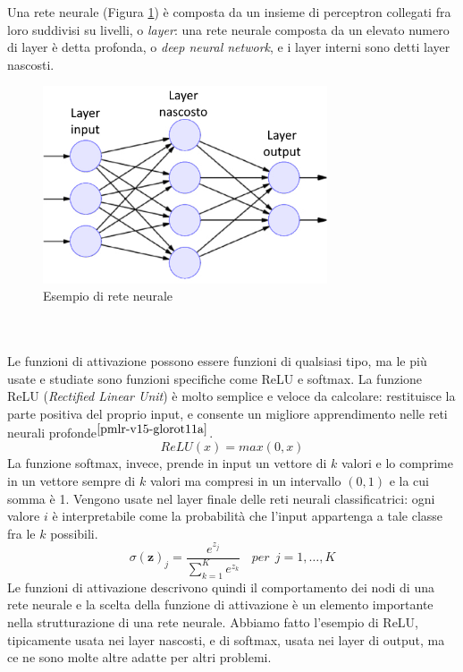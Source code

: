 Una rete neurale (Figura \ref{fig:reteneurale}) è composta da un insieme di perceptron collegati fra loro suddivisi su livelli, o \textit{layer}: una rete neurale composta da un elevato numero di layer è detta profonda, o \textit{deep neural network}, e i layer interni sono detti layer nascosti.
\begin{figure}[b]
	\begin{center}
		\includegraphics[width=0.75\textwidth]{img/reteneurale.jpg}
		\caption{Esempio di rete neurale}
		\label{fig:reteneurale}
	\end{center}
\end{figure}
\\\\
Le funzioni di attivazione possono essere funzioni di qualsiasi tipo, ma le più usate e studiate sono funzioni specifiche come ReLU e softmax. La funzione ReLU (\textit{Rectified Linear Unit}) è molto semplice e veloce da calcolare: restituisce la parte positiva del proprio input, e consente un migliore apprendimento nelle reti neurali profonde$^{\cite{pmlr-v15-glorot11a}}$.
\begin{equation}\label{eq:fun_relu}
ReLU(x) = max(0, x)
\end{equation}
La funzione softmax, invece, prende in input un vettore di $k$ valori e lo comprime in un vettore sempre di $k$ valori ma compresi in un intervallo $(0, 1)$ e la cui somma è 1. Vengono usate nel layer finale delle reti neurali classificatrici: ogni valore $i$  è interpretabile come la probabilità che l'input appartenga a tale classe fra le $k$ possibili.
\begin{equation}\label{eq:fun_softmax}
\sigma(\textbf{z})_j = \frac{e^{z_j}}{\sum_{k=1}^K e^{z_k}}\:\:\:\:per\:\:j = 1,\ldots,K
\end{equation}
Le funzioni di attivazione descrivono quindi il comportamento dei nodi di una rete neurale e la scelta della funzione di attivazione è un elemento importante nella strutturazione di una rete neurale. Abbiamo fatto l'esempio di ReLU, tipicamente usata nei layer nascosti, e di softmax, usata nei layer di output, ma ce ne sono molte altre adatte per altri problemi.

